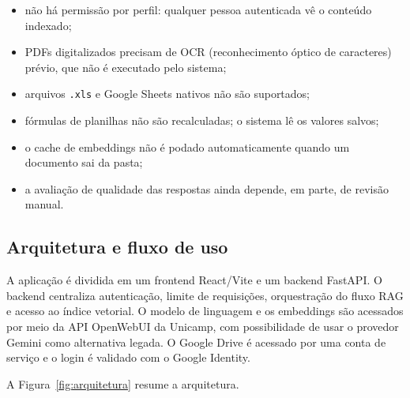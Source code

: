 \documentclass[12pt,a4paper]{article}
\begin{document}
\begin{itemize}
  \item não há permissão por perfil: qualquer pessoa autenticada vê o conteúdo
        indexado;
  \item PDFs digitalizados precisam de OCR (reconhecimento óptico de caracteres) prévio, que não é executado pelo sistema;
  \item arquivos \texttt{.xls} e Google Sheets nativos não são suportados;
  \item fórmulas de planilhas não são recalculadas; o sistema lê os valores salvos;
  \item o cache de embeddings não é podado automaticamente quando um documento sai
        da pasta;
  \item a avaliação de qualidade das respostas ainda depende, em parte, de revisão
        manual.
\end{itemize}

\subsection{Arquitetura e fluxo de uso}

A aplicação é dividida em um frontend React/Vite e um backend FastAPI. O backend
centraliza autenticação, limite de requisições, orquestração do fluxo RAG e acesso
ao índice vetorial. O modelo de linguagem e os embeddings são acessados por meio da
API OpenWebUI da Unicamp, com possibilidade de usar o provedor Gemini como
alternativa legada. O Google Drive é acessado por uma conta de serviço e o login é
validado com o Google Identity.

A Figura~\ref{fig:arquitetura} resume a arquitetura.
\end{document}
